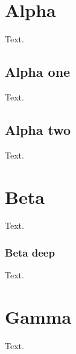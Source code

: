 \documentclass{article}
\begin{document}
\tableofcontents
\section{Alpha}
Text.
\subsection{Alpha one}
Text.
\subsection{Alpha two}
Text.
\section{Beta}
Text.
\subsubsection{Beta deep}
Text.
\section*{Gamma}
Text.
\end{document}
